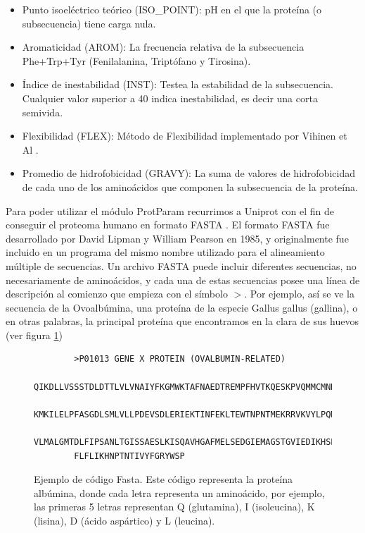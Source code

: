 \begin{itemize}
    \item Punto isoeléctrico teórico (ISO\_POINT): pH en el que la proteína (o subsecuencia) tiene carga nula. 
    \item Aromaticidad (AROM): La frecuencia relativa de la subsecuencia Phe+Trp+Tyr (Fenilalanina, Triptófano y Tirosina). 
    \item Índice de inestabilidad (INST): Testea la estabilidad de la subsecuencia. Cualquier valor superior a 40 indica inestabilidad, es decir una corta semivida. 
    \item Flexibilidad (FLEX): Método de Flexibilidad implementado por Vihinen et Al \cite{vihinen1994}.  
    \item Promedio de hidrofobicidad (GRAVY): La suma de valores de hidrofobicidad de cada uno de los aminoácidos que componen la subsecuencia de la proteína.
\end{itemize}


Para poder utilizar el módulo ProtParam recurrimos a Uniprot \cite{uniprot} con el fin de conseguir el proteoma humano en formato FASTA \cite{FASTA}. El formato FASTA fue desarrollado por David Lipman y William Pearson en 1985, y originalmente fue incluido en un programa del mismo nombre utilizado para el alineamiento múltiple de secuencias. Un archivo FASTA puede incluir diferentes secuencias, no necesariamente de aminoácidos, y cada una de estas secuencias posee una línea de descripción al comienzo que empieza con el símbolo $>$. Por ejemplo, así se ve la secuencia de la Ovoalbúmina, una proteína de la especie Gallus gallus (gallina), o en otras palabras, la principal proteína que encontramos en la clara de sus huevos (ver figura \ref{code:fasta_code})

\begin{figure}[H]
    \begin{verbatim}
    	>P01013 GENE X PROTEIN (OVALBUMIN-RELATED)
    	QIKDLLVSSSTDLDTTLVLVNAIYFKGMWKTAFNAEDTREMPFHVTKQESKPVQMMCMNNSFNVATLPAE
    	KMKILELPFASGDLSMLVLLPDEVSDLERIEKTINFEKLTEWTNPNTMEKRRVKVYLPQMKIEEKYNLTS
    	VLMALGMTDLFIPSANLTGISSAESLKISQAVHGAFMELSEDGIEMAGSTGVIEDIKHSPESEQFRADHP
    	FLFLIKHNPTNTIVYFGRYWSP
    \end{verbatim}
\caption{Ejemplo de código Fasta. Este código representa la proteína albúmina, donde cada letra representa un aminoácido, por ejemplo, las primeras 5 letras representan Q (glutamina), I (isoleucina), K (lisina), D (ácido aspártico) y L (leucina).}
\label{code:fasta_code}

\end{figure}

